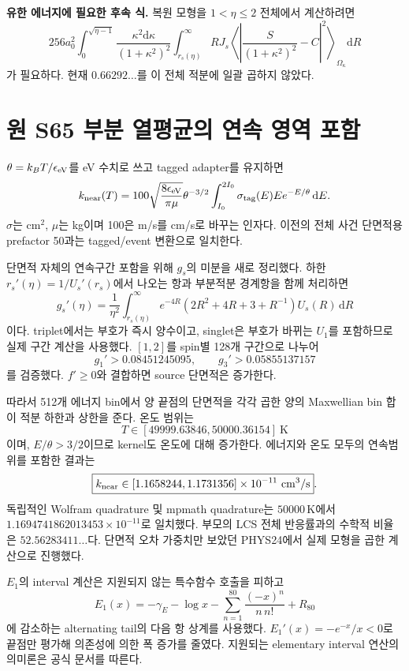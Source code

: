 \documentclass[11pt,a4paper]{article}
\newcommand{\dd}{\mathrm d}\newcommand{\kb}{k_{\rm B}}\newcommand{\ev}{\epsilon_{\rm eV}}\newcommand{\eV}{\mathrm{eV}}\newcommand{\cm}{\mathrm{CM}}\newcommand{\lab}{\mathrm{lab}}
\numberwithin{equation}{section}
\begin{document}
\textbf{유한 에너지에 필요한 후속 식.} 복원 모형을 $1<\eta\le2$ 전체에서 계산하려면
\[
256a_0^2\!\int_0^{\sqrt{\eta-1}}\!\frac{\kappa^2\dd\kappa}{(1+\kappa^2)^2}
\int_{r_s(\eta)}^\infty\! RJ_s
\left\langle\left|\frac{S}{(1+\kappa^2)^2}-C\right|^2\right\rangle_{\Omega_\kappa}\dd R
\]
가 필요하다. 현재 $0.66292\ldots$를 이 전체 적분에 일괄 곱하지 않았다.

\newpage
\section{원 S65 부분 열평균의 연속 영역 포함}
$\theta=k_BT/\ev$를 eV 수치로 쓰고 tagged adapter를 유지하면
\begin{equation}
k_{\rm near}(T)=100\sqrt{\frac{8\ev}{\pi\mu}}\theta^{-3/2}
\int_{I_0}^{2I_0}\sigma_{\rm tag}(E)E e^{-E/\theta}\,\dd E.
\end{equation}
$\sigma$는 $\mathrm{cm^2}$, $\mu$는 kg이며 100은 m/s를 cm/s로 바꾸는 인자다. 이전의 전체 사건 단면적용 prefactor 50과는 tagged/event 변환으로 일치한다.

단면적 자체의 연속구간 포함을 위해 $g_s$의 미분을 새로 정리했다. 하한 $r_s'(\eta)=1/U_s'(r_s)$에서 나오는 항과 부분적분 경계항을 함께 처리하면
\begin{equation}\boxed{
g_s'(\eta)=\frac1{\eta^2}\int_{r_s(\eta)}^\infty
 e^{-4R}(2R^2+4R+3+R^{-1})U_s(R)\,\dd R
}\end{equation}
이다. triplet에서는 부호가 즉시 양수이고, singlet은 부호가 바뀌는 $U_1$를 포함하므로 실제 구간 계산을 사용했다. $[1,2]$를 spin별 128개 구간으로 나누어
\[
g_1'>0.08451245095,\qquad g_3'>0.05855137157
\]
를 검증했다. $f'\ge0$와 결합하면 source 단면적은 증가한다.

따라서 512개 에너지 bin에서 양 끝점의 단면적을 각각 곱한 양의 Maxwellian bin 합이 적분 하한과 상한을 준다. 온도 범위는
\[
T\in[49999.63846,50000.36154]\ \mathrm K
\]
이며, $E/\theta>3/2$이므로 kernel도 온도에 대해 증가한다. 에너지와 온도 모두의 연속범위를 포함한 결과는
\begin{equation}
\boxed{k_{\rm near}\in[1.1658244,1.1731356]\times10^{-11}\ \mathrm{cm^3/s}}.
\end{equation}
독립적인 Wolfram quadrature 및 mpmath quadrature는 $50000\,\mathrm K$에서 $1.1694741862013453\times10^{-11}$로 일치했다. 부모의 LCS 전체 반응률과의 수학적 비율은 $52.56283411\ldots$다. 단면적 오차 가중치만 보았던 PHYS24에서 실제 모형을 곱한 계산으로 진행했다.

$E_1$의 interval 계산은 지원되지 않는 특수함수 호출을 피하고
\[
E_1(x)=-\gamma_E-\log x-\sum_{n=1}^{80}\frac{(-x)^n}{n\,n!}+R_{80}
\]
에 감소하는 alternating tail의 다음 항 상계를 사용했다. $E_1'(x)=-e^{-x}/x<0$로 끝점만 평가해 의존성에 의한 폭 증가를 줄였다. 지원되는 elementary interval 연산의 의미론은 공식 문서를 따른다\cite{mpmath}.
\end{document}
